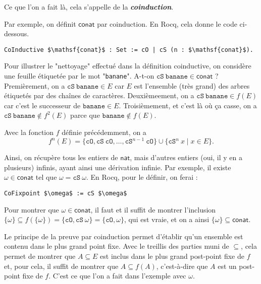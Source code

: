 \documentclass[../main]{subfiles}
\begin{document}
  Ce que l'on a fait là, cela s'appelle de la \textit{\textbf{coinduction}}.

  \begin{exm}
    Par exemple, on définit $\mathsf{conat}$ par coinduction.
    En Rocq, cela donne le code ci-dessous.
    \begin{lstlisting}[language=coq,caption=Définition de $\mathsf{conat}$]
  CoInductive $\mathsf{conat}$ : Set := cO | cS (n : $\mathsf{conat}$).
    \end{lstlisting}

    Pour illustrer le "nettoyage" effectué dans la définition coinductive, on considère une feuille étiquetée par le mot "\texttt{banane}".
    A-t-on $\mathtt{cS}\ \mathtt{banane} \in \mathsf{conat}$ ?
    Premièrement, on a $\mathtt{cS}\ \mathtt{banane} \in E$ car $E$ est l'ensemble (très grand) des arbres étiquetés par des chaînes de caractères.
    Deuxièmeement, on a $\mathtt{cS}\ \mathtt{banane} \in f(E)$ car c'est le successeur de $\mathtt{banane} \in E$.
    Troisièmement, et c'est là où ça casse, on a $\mathtt{cS\ banane} \not\in f^2(E)$ parce que $\mathtt{banane} \not\in f(E)$.
    

    Avec la fonction $f$ définie précédemment, on a \[
    f^n (E) = \{\mathtt{cO}, \mathtt{cS}\ \mathtt{cO}, \ldots, \mathtt{cS}^{n-1}\ \mathtt{cO}\} \cup \{\mathtt{cS}^n \ x  \mid  x \in E\} 
    .\]

    Ainsi, on récupère tous les entiers de $\mathsf{nat}$, mais d'autres entiers (oui, il y en a plusieurs) infinis, ayant ainsi une dérivation infinie.
    Par exemple, il existe $\omega \in \mathsf{conat}$ tel que $\omega = \mathtt{cS}\ \omega$.
    En Rocq, pour le définir, on ferai :
    \begin{lstlisting}[language=coq,caption={Définition de $\omega$, un entier infini}]
  CoFixpoint $\omega$ := cS $\omega$
    \end{lstlisting}
    Pour montrer que $\omega \in \mathsf{conat}$, il faut et il suffit de montrer l'inclusion $\{\omega\}\subseteq f(\{\omega\} ) = \{\mathtt{cO}, \mathtt{cS}\ \omega\} = \{\mathtt{cO}, \omega\}$, qui est vraie, et on a ainsi $\{\omega\} \subseteq \mathsf{conat}$.
  \end{exm}

  Le principe de la preuve par coinduction permet d'établir qu'un ensemble est contenu dans le plus grand point fixe.
  Avec le treillis des parties muni de $\subseteq$, cela permet de montrer que $A \subseteq E$ est inclus dans le plus grand post-point fixe de $f$ et, pour cela, il suffit de montrer que $A \subseteq f(A)$, c'est-à-dire que $A$ est un post-point fixe de $f$.
  C'est ce que l'on a fait dans l'exemple avec $\omega$.
\end{document}
